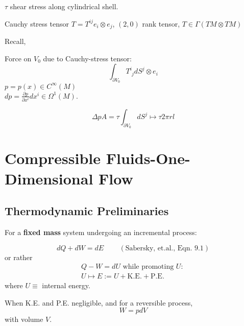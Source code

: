 \documentclass[twoside,landscape,10pt]{amsart}
\theoremstyle{plain}
\theoremstyle{definition}
\theoremstyle{remark}
\theoremstyle{remark}
\begin{document}
\begin{multicols*}{2}
$\tau$ shear stress along cylindrical shell.

Cauchy stress tensor $T = T^{ij} e_i \otimes e_j$, $(2,0)$ rank tensor, $T \in \Gamma(TM \otimes TM)$

Recall,


Force on $V_0$ due to Cauchy-stress tensor:
\[
\int_{\partial V_0} T^i_{\,\, j} dS^j \otimes e_i
\]
$p=p(x) \in C^{\infty}(M)$ \\
$dp = \frac{\partial p }{ \partial x^i } dx^i \in \Omega^1(M)$.

\[
\Delta p A = \tau \int_{\partial V_0} dS^j \mapsto \tau 2\pi r l
\]


\section{Compressible Fluids-One-Dimensional Flow}

\subsection{Thermodynamic Preliminaries}

For a \textbf{fixed mass} system undergoing an incremental process:

\begin{equation}
dQ + dW = dE \qquad \, (\text{Sabersky, et.al., Eqn. 9.1})
\end{equation}
or rather
\begin{equation}
\begin{gathered} 
Q - W = dU \text{ while promoting $U$: } \\
U \mapsto E := U + \text{K.E.} + \text{P.E.} 
\end{gathered}
\end{equation}
where $U \equiv $ internal energy.

When K.E. and P.E. negligible, and for a reversible process, 
\begin{equation}
W = pdV
\end{equation} 	
with volume $V$.


\end{multicols*}
\end{document}
